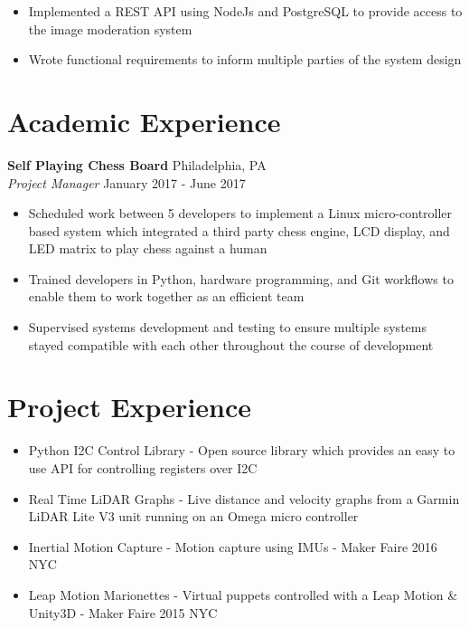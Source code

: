 \documentclass[10pt]{article}
\begin{document}
\begin{flushleft}
\begin{itemize}
		\item Implemented a REST API using NodeJs and PostgreSQL to provide access to the image moderation system

		\item Wrote functional requirements to inform multiple parties of the system design
	\end{itemize}

\section{Academic Experience}
	\textbf{Self Playing Chess Board} \hfill Philadelphia, PA \\
	\textit{Project Manager} \hfill January 2017 - June 2017 \\
	\begin{itemize}
		\item Scheduled work between 5 developers to implement a Linux micro-controller based system which integrated a 
			third party chess engine, LCD display, and LED matrix to play chess against a human

		\item Trained developers in Python, hardware programming, and Git workflows to enable them to work together as 
			an efficient team 

		\item Supervised systems development and testing to ensure multiple systems stayed compatible with each other 
		    throughout the course of development
	\end{itemize}

\section{Project Experience}
	\begin{itemize}
		\item Python I2C Control Library - Open source library which provides an easy to use API for controlling 
			registers over I2C

		\item Real Time LiDAR Graphs - Live distance and velocity graphs from a Garmin LiDAR Lite V3 unit running on an 
			Omega micro controller

		\item Inertial Motion Capture - Motion capture using IMUs - Maker Faire 2016 NYC

		\item Leap Motion Marionettes - Virtual puppets controlled with a Leap Motion \& Unity3D - Maker Faire 2015 NYC


\end{itemize}
\end{flushleft}
\end{document}
